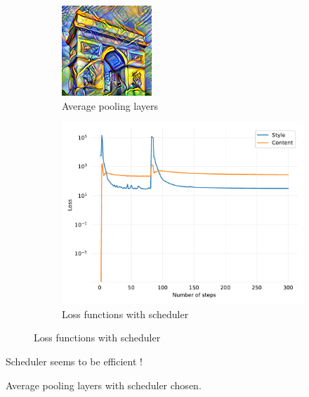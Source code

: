 \documentclass[12pt]{beamer}
\begin{document}
    \begin{frame}
        \begin{figure}[H]
            \centering
            \begin{subfigure}[b]{0.40\textwidth}
                \centering
                \includegraphics[width=\textwidth]{resources/gatys/architecture/sun-trees-paris-avgpool-scheduler.png}
                \caption{Average pooling layers}
            \end{subfigure}
            \hfill
            \begin{subfigure}[b]{0.50\textwidth}
                \centering
                \includegraphics[width=\textwidth]{resources/gatys/architecture/sun-trees-paris-avgpool-scheduler.pdf}
                \caption{Loss functions with scheduler}
            \end{subfigure}
        \end{figure}
        
        Scheduler seems to be efficient !
        
        \footnotesize{Average pooling layers with scheduler chosen.}
    \end{frame}
    
\end{document}
